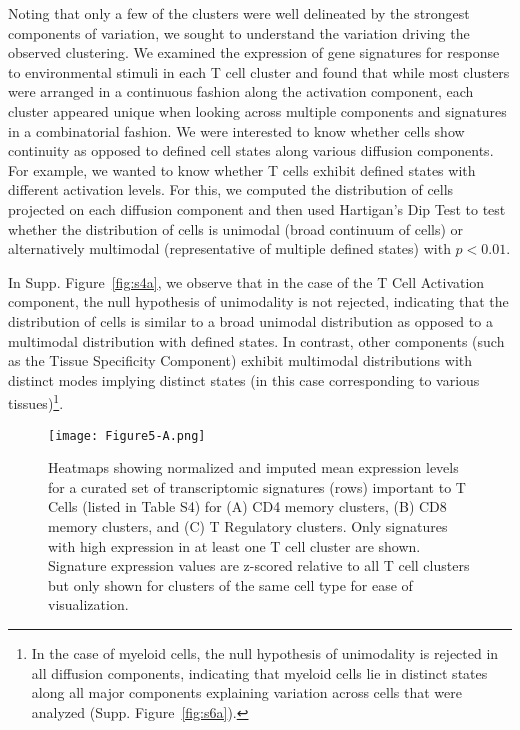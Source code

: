 Noting that only a few of the clusters were well delineated by the strongest components of variation, we sought to understand the variation driving the observed clustering.
We examined the expression of gene signatures for response to environmental stimuli in each T cell cluster and found that while most clusters were arranged in a continuous fashion along the activation component, each cluster appeared unique when looking across multiple components and signatures in a combinatorial fashion. 
We were interested to know whether cells show continuity as opposed to defined cell states along various diffusion components.
For example, we wanted to know whether T cells exhibit defined states with different activation levels.
For this, we computed the distribution of cells projected on each diffusion component and then used Hartigan's Dip Test \citep{Hartigan1985} to test whether the distribution of cells is unimodal (broad continuum of cells) or alternatively multimodal (representative of multiple defined states) with $p<0.01$.

In Supp. Figure~\ref{fig:s4a}, we observe that in the case of the T Cell Activation component, the null hypothesis of unimodality is not rejected, indicating that the distribution of cells is similar to a broad unimodal distribution as opposed to a multimodal distribution with defined states. 
In contrast, other components (such as the Tissue Specificity Component) exhibit multimodal distributions with distinct modes implying distinct states (in this case corresponding to various tissues)\footnote{In the case of myeloid cells, the null hypothesis of unimodality is rejected in all diffusion components, indicating that myeloid cells lie in distinct states along all major components explaining variation across cells that were analyzed (Supp. Figure~\ref{fig:s6a}).}.

\begin{figure}
\centering
\texttt{[image: Figure5-A.png]}
\caption{Heatmaps showing normalized and imputed mean expression levels for a curated set of transcriptomic signatures (rows) important to T Cells (listed in Table S4) for (A) CD4 memory clusters, (B) CD8 memory clusters, and (C) T Regulatory clusters.
  Only signatures with high expression in at least one T cell cluster are shown.
  Signature expression values are z-scored relative to all T cell clusters but only shown for clusters of the same cell type for ease of visualization.
}
\label{fig:5a}
\end{figure}

